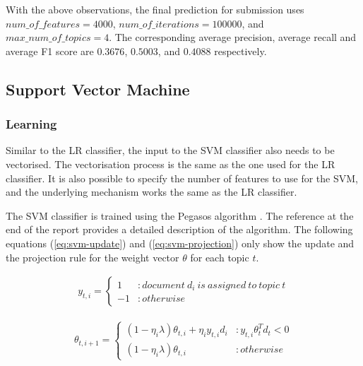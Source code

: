 \documentclass[11pt]{article}
\begin{document}
With the above observations, the final prediction for submission uses  $num\_of\_features=4000$, $num\_of\_iterations = 100000$, and $max\_num\_of\_topics = 4$.
The corresponding average precision, average recall and average F1 score are $0.3676$, $0.5003$, and $0.4088$ respectively.

\subsection{Support Vector Machine}
\subsubsection*{Learning}
Similar to the LR classifier, the input to the SVM classifier also needs to be vectorised.
The vectorisation process is the same as the one used for the LR classifier.
It is also possible to specify the number of features to use for the SVM, and the underlying mechanism works the same as the LR classifier.

The SVM classifier is trained using the Pegasos algorithm \cite{pegasos}.
The reference at the end of the report provides a detailed description of the algorithm.
The following equations (\ref{eq:svm-update}) and (\ref{eq:svm-projection}) only show the update and the projection rule for the weight vector $\theta$ for each topic $t$.

\begin{equation}
    \label{eq:svm-y}
    \begin{split}
        y_{t, i} = \left\{
            \begin{array}{lr}
                1 & : document\ d_i\ is\ assigned\ to\ topic\ t \\
                -1 & : otherwise
            \end{array}
        \right.
    \end{split}
\end{equation}

\begin{equation}
    \label{eq:svm-update}
    \begin{split}
        \theta_{t, i+1} = \left\{
            \begin{array}{lr}
                (1 - \eta_i \lambda) \theta_{t, i} + \eta_i y_{t, i} d_i & : y_{t, i}\theta_t^T d_t < 0 \\
                (1 - \eta_i \lambda) \theta_{t, i} & : otherwise
            \end{array}
        \right.
    \end{split}
\end{equation}
\end{document}
